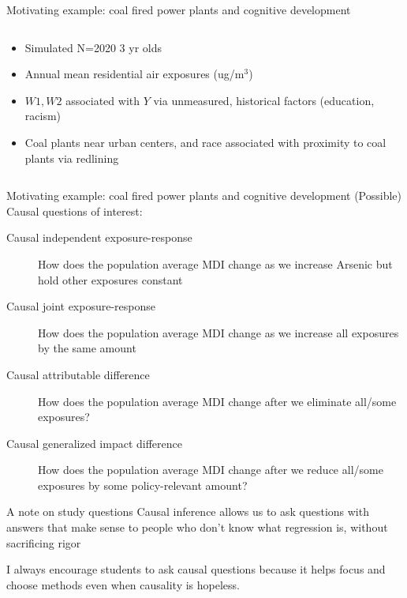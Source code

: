 \begin{frame}{Motivating example: coal fired power plants and cognitive development}
  \begin{columns}
    \begin{column}[t]{.4\textwidth}
      \begin{itemize}
      \item Simulated N=2020 3 yr olds
      \item Annual mean residential air exposures (ug/m$^3$)
      \item $W1,W2$ associated with $Y$ via unmeasured, historical factors (education, racism)
      \item Coal plants near urban centers, and race associated with proximity to coal plants via redlining
    \end{itemize}
    \end{column}
    \begin{column}[t]{.7\textwidth}
  
    \end{column}
  \end{columns}
\end{frame}


\begin{frame}{Motivating example: coal fired power plants and cognitive development}
(Possible) Causal questions of interest:
    \begin{description}
      \item[Causal independent exposure-response] How does the population average MDI change as we increase Arsenic but hold other exposures constant
      \item[Causal joint exposure-response] How does the population average MDI change as we increase all exposures by the same amount
      \item[Causal attributable difference] How does the population average MDI change after we eliminate all/some exposures?
      \item[Causal generalized impact difference] How does the population average MDI change after we reduce all/some exposures by some policy-relevant amount?
    \end{description}
\end{frame}


\begin{frame}{A note on study questions}
Causal inference allows us to ask questions with answers that make sense to people who don't know what regression is, without sacrificing rigor
\bigskip

I always encourage students to ask causal questions because it helps focus and choose methods even when causality is hopeless.

\end{frame}


